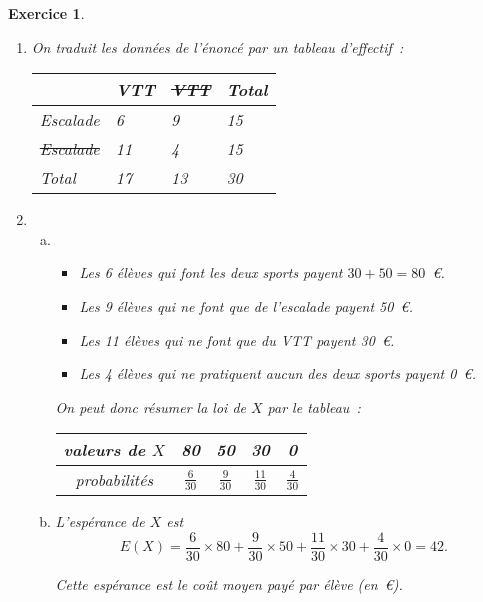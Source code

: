 \documentclass[10pt]{article}
\newtheorem{exo}{Exercice}
\begin{document}
\begin{exo}



\begin{enumerate}
\item On traduit les données de l'énoncé par un tableau d'effectif~:

\begin{center}
 \begin{tabular}{|m{2cm}|m{2cm}|m{2cm}|m{2cm}|}\hline
& VTT &\st{VTT}& Total \\ \hline 
Escalade& 6&9 &15 \\ \hline
\st{Escalade}&11 &4 &15 \\ \hline
Total& 17&13 & 30\\ \hline
\end{tabular}
\end{center}
\item \begin{enumerate}[(a)]
\item



\begin{itemize}
\item[\textbullet] Les 6 élèves qui font les deux sports payent $30+50=80$~\euro.
\item[\textbullet] Les 9 élèves qui ne font que de l'escalade payent 50~\euro. 
\item[\textbullet] Les 11 élèves qui ne font que du VTT payent 30~\euro. 
\item[\textbullet] Les 4 élèves qui ne pratiquent aucun des deux sports payent 0~\euro. 
\end{itemize}

On peut donc résumer la loi de $X$ par le tableau~:

\begin{center}
\renewcommand{\arraystretch}{1.5}
\begin{tabular}{|c|c|c|c|c|}
\hline
    valeurs de $X$     & 80       & 50       & 30&0   \\
\hline
probabilités & $\frac{6}{30}$ &$\frac{9}{30}$ &$\frac{11}{30}$ &$\frac{4}{30}$      \\
\hline
\end{tabular}
\end{center}

\item L'espérance de $X$ est \[E(X)=\frac{6}{30}\times 80+\frac{9}{30}\times 50+\frac{11}{30}\times 30+\frac{4}{30}\times 0= 42.\]

Cette espérance est le coût moyen payé par élève (en~\euro ).
\end{enumerate}
\end{enumerate}
\end{exo}
\end{document}
